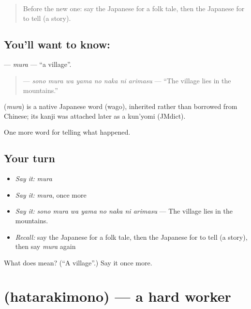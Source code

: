 \begin{quote}
Before the new one: say the Japanese for a folk tale, then the Japanese for to tell (a story).
\end{quote}

\subsection*{You'll want to know: }
\textbf{} — \emph{mura} — \textquotedblleft{}a village\textquotedblright{}.

\begin{quote}
\textbf{    } — \emph{sono mura wa yama no naka ni arimasu} — \textquotedblleft{}The village lies in the mountains.\textquotedblright{}
\end{quote}

\begin{cousinweb}
\textbf{} (\emph{mura}) is a native Japanese word (wago), inherited rather than borrowed from Chinese; its kanji was attached later as a kun'yomi (JMdict).
\end{cousinweb}

\begin{grammarlens}[title={What you've built}]
One more word for telling what happened.
\end{grammarlens}

\subsection*{Your turn}
\begin{itemize}
\raggedright
  \item \emph{Say it:} \emph{mura}
  \item \emph{Say it:} \emph{mura}, once more
  \item \emph{Say it:} \emph{sono mura wa yama no naka ni arimasu} — The village lies in the mountains.
  \item \emph{Recall:} say the Japanese for a folk tale, then the Japanese for to tell (a story), then say \emph{mura} again
\end{itemize}

\begin{tcolorbox}[breakable,colback=teal!4,colframe=teal!35!black,title={Before you move on}]
What does  mean? (\textquotedblleft{}A village\textquotedblright{}.) Say it once more.
\end{tcolorbox}
\section[\texorpdfstring{\ja{はたらきもの} (hatarakimono)}{はたらきもの (hatarakimono)}]{ (hatarakimono) — a hard worker}

